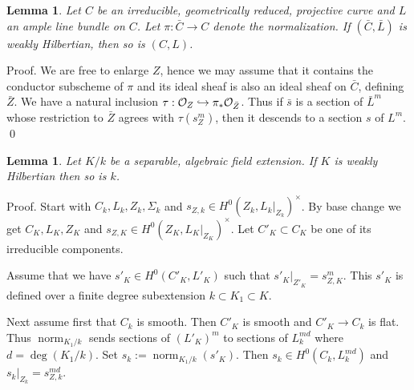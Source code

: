 \documentclass{amsart}
\newtheorem{lem}[thm]{Lemma}
\theoremstyle{definition}
\theoremstyle{remark}
\renewcommand{\o}[0]{{\mathcal O}}
\newcommand{\q}[0]{{\mathbb Q}}
\newcommand{\qtq}[1]{\quad\mbox{#1}\quad}
\def\into{\DOTSB\lhook\joinrel\to}
\newcommand{\norm}[0]{\operatorname{norm}}
\begin{document}
\begin{lem}\label{wH.goes.down.lem.0}
Let  $C$ be an irreducible,  geometrically reduced,  projective curve  and $L$ an  ample line bundle  on $C$. Let $\pi:\bar C\to C$ denote the normalization.
If $(\bar C, \bar L)$ is  weakly Hilbertian, then so is $(C, L)$.
\end{lem}

Proof. 
We are free to enlarge $Z$, hence we may assume that 
 it contains the conductor subscheme of $\pi$ and 
its ideal sheaf is also an ideal sheaf on $\bar C$, defining $\bar Z$.  We have a natural inclusion  $\tau: \o_{Z}\into \pi_*\o_{\bar Z}$. Thus if $\bar s$ is a section of $\bar L^m$
whose restriction to $\bar Z$ agrees with $\tau(s_Z^m)$, then
it descends to a section $s$ of $L^m$. \qed








\begin{lem}\label{wH.goes.down.lem}
 Let $K/k$ be a  separable, algebraic field extension. If $K$ 
is weakly Hilbertian  then so is $k$.
\end{lem}





Proof. Start with  $C_k, L_k, Z_k, \Sigma_k$ and  $s_{Z,k}\in H^0(Z_k, L_k|_{Z_k})^\times$. 
By base change we get $C_K, L_K, Z_K$ and   $s_{Z,K}\in H^0(Z_K, L_K|_{Z_K})^\times$.  Let $C'_K\subset C_K$ be one of its irreducible components.


Assume that we have $s'_K\in H^0(C'_K, L'_K)$ such that   $s'_K|_{Z'_K}=s_{Z,K}^m$.
This $s'_K$ is defined over a finite degree subextension
$k\subset K_1\subset K$.

Next assume first that  $C_k$ is smooth. Then $C'_K$ is smooth and
$C'_K\to C_k$ is flat. Thus $\norm_{K_1/k}$ sends sections of
$(L'_K)^m$ to sections of
$L_k^{md}$  where $d=\deg (K_1/k)$. 
Set   $s_k:=\norm_{K_1/k}(s'_K)$.  Then $s_k\in H^0(C_k, L_k^{md})$ and
$s_k|_{Z_k}=s_{Z,k}^{md}$.
\end{document}
